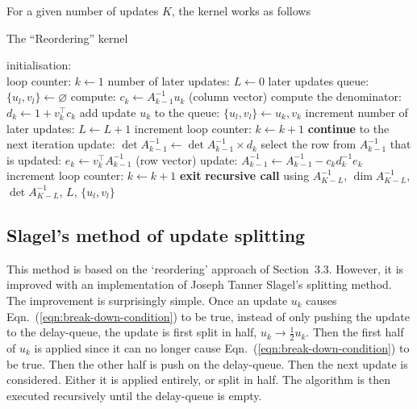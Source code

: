 \documentclass[11pt]{article}
\numberwithin{figure}{section}
\numberwithin{table}{section}
\begin{document}
				For a given number of updates $K$, the kernel works as follows\\
				
				\begin{algorithm}[H]
				\caption{The ``Reordering'' kernel}\label{algo:reordering}
				initialisation:\\
				loop counter: $k \gets 1$\;
				number of later updates: $L \gets 0$\;
				later updates queue: $\{u_l, v_l\} \gets \varnothing$\;
				{
					compute: $c_k \gets A^{-1}_{k-1}u_k$ (column vector)\;
					compute the denominator: $d_k \gets 1 + v_k^\top c_k$\;
					{
						add update $u_k$ to the queue: $\{u_l,v_l\} \gets u_k, v_k$\;
						increment number of later updates: $L \gets L + 1$\;
						increment loop counter: $k \gets k + 1$\;
						\textbf{continue} to the next iteration\;
					}
					update: $\det A^{-1}_{k-1} \gets \det A^{-1}_{k-1}\times d_k$\;
					select the row from $A^{-1}_{k-1}$ that is updated: $e_k \gets v_k^\top A^{-1}_{k-1}$ (row vector)\;
					update: $A^{-1}_{k-1} \gets A^{-1}_{k-1} - c_kd_k^{-1}e_k$\;
					increment loop counter: $k \gets k + 1$\;
				}
				{
					\textbf{exit}\;
				}
				{
					\textbf{recursive call} using $A^{-1}_{K-L}$, $\dim A^{-1}_{K-L}$, $\det A^{-1}_{K-L} $, $L$, $\{u_l, v_l\}$\;
				}
				\end{algorithm}

			\subsection{Slagel's method of update splitting}\label{sec:splitting}
				This method is based on the `reordering' approach of Section~3.3. However, it is improved with an implementation of Joseph Tanner Slagel's splitting method\cite{jtslagel2015}.\\
				
				The improvement is surprisingly simple. Once an update $u_k$ causes Eqn.~(\ref{eqn:break-down-condition}) to be true, instead of only pushing the update to the delay-queue, the update is first split in half, $u_k\rightarrow\frac{1}{2}u_k$. Then the first half of $u_k$ is applied since it can no longer cause Eqn.~(\ref{eqn:break-down-condition}) to be true. Then the other half is push on the delay-queue. Then the next update is considered. Either it is applied entirely, or split in half. The algorithm is then executed recursively until the delay-queue is empty.\\
\end{document}
